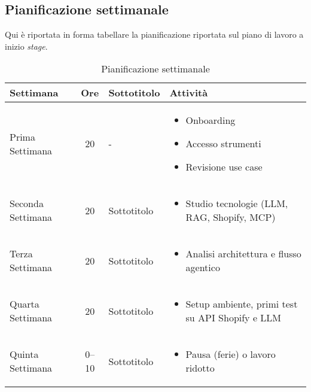 \subsection{Pianificazione settimanale}

Qui è riportata in forma tabellare la pianificazione riportata sul piano di lavoro a inizio \emph{stage}.

\begin{table}[H]
    \centering
    \caption{Pianificazione settimanale}
    \begin{tabularx}{\textwidth}{|@{} l c l >{\raggedright\arraybackslash}X|}%
        \hline
        \textbf{Settimana} & \textbf{Ore} & \textbf{Sottotitolo} & \textbf{Attività} \\
        \hline
        Prima Settimana & 20 & - & 
            \begin{itemize}
            \item Onboarding
            \item Accesso strumenti
            \item Revisione use case
            \end{itemize} \\
            \hline
        Seconda Settimana & 20 & Sottotitolo & 
            \begin{itemize}
            \item Studio tecnologie (LLM, RAG, Shopify, MCP)
            \end{itemize} \\
            \hline
        Terza Settimana & 20 & Sottotitolo & 
            \begin{itemize}
            \item Analisi architettura e flusso agentico
            \end{itemize} \\
            \hline
        Quarta Settimana & 20 & Sottotitolo & 
            \begin{itemize}
            \item Setup ambiente, primi test su API Shopify e LLM
            \end{itemize} \\
            \hline
        Quinta Settimana & 0--10 & Sottotitolo & 
            \begin{itemize}
            \item Pausa (ferie) o lavoro ridotto
            \end{itemize} \\
            \hline

\end{tabularx}
\end{table}
